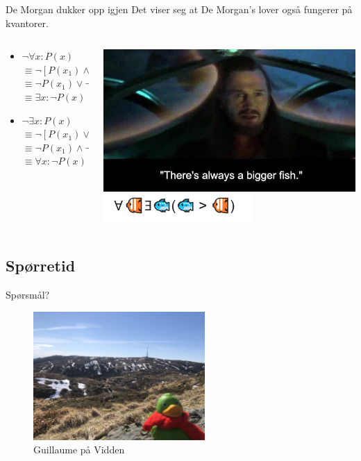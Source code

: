 \begin{frame}{De Morgan dukker opp igjen}
Det viser seg at De Morgan's lover også fungerer på kvantorer.\\
    \begin{columns}
    \begin{column}{0.48\textwidth}
    \begin{itemize}
        \item $\lnot \forall x : P(x)$ \\
        $\equiv \lnot [P(x_1) \land P(x_2) \land ... \land P(x_n)]$\\
        $\equiv \lnot P(x_1) \lor \lnot P(x_2) \lor ... \lor \lnot P(x_n)$\\ $\equiv \exists x : \lnot P(x)$
        \pause
        \item $\lnot \exists x : P(x)$\\
        $\equiv \lnot [P(x_1) \lor P(x_2) \lor ... \lor .. P(x_n)]$\\
        $\equiv \lnot P(x_1) \land \lnot P(x_2) \land ... \land \lnot P(x_n)$\\ 
        $\equiv \forall x : \lnot P(x)$
    \end{itemize}      
    \end{column}
    \pause
    \begin{column}{0.45\textwidth}
        \includegraphics[scale=0.3]{images/Always a bigger fish.jpeg}
        \pause
        \includegraphics[scale=1]{images/bigger fish.PNG}
    \end{column}
    \end{columns}
\end{frame}

\subsection*{Spørretid}
\begin{frame}{Spørsmål?}
    \begin{figure}
        \centering
        \includegraphics[height = 4.9cm]{images/guillaume5.jpg}
        \caption{Guillaume på Vidden}
        \label{fig:guillaume5}
    \end{figure}
\end{frame}